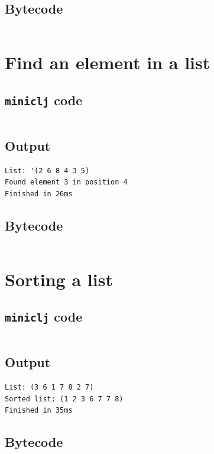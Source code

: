 \documentclass[11pt]{scrreprt}
\begin{document}
\subsection{Bytecode}
\inputminted{text}{/home/mario/git/MarioJim/miniclj/examples/recursive_fibonacci.mclj}


\section{Find an element in a list}
\subsection{\texttt{miniclj} code}
\inputminted{clojure}{/home/mario/git/MarioJim/miniclj/examples/find_in_list.clj}

\subsection{Output}
\begin{verbatim}
List: '(2 6 8 4 3 5)
Found element 3 in position 4
Finished in 26ms
\end{verbatim}

\subsection{Bytecode}
\inputminted{text}{/home/mario/git/MarioJim/miniclj/examples/find_in_list.mclj}


\section{Sorting a list}
\subsection{\texttt{miniclj} code}
\inputminted{clojure}{/home/mario/git/MarioJim/miniclj/examples/sort_list.clj}

\subsection{Output}
\begin{verbatim}
List: (3 6 1 7 8 2 7)
Sorted list: (1 2 3 6 7 7 8)
Finished in 35ms
\end{verbatim}

\subsection{Bytecode}
\inputminted{text}{/home/mario/git/MarioJim/miniclj/examples/sort_list.mclj}
\end{document}
